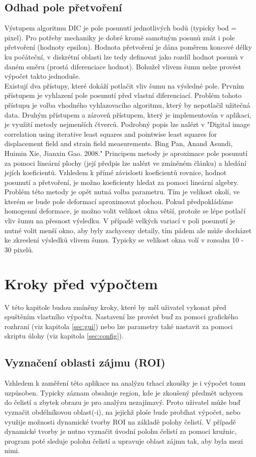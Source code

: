 \documentclass[a4paper,12pt]{article}
\begin{document}
\subsection{Odhad pole přetvoření}
Výstupem algoritmu DIC je pole posunutí jednotlivých bodů (typicky bod = pixel). Pro potřeby mechaniky je dobré kromě samotným posunů znát i pole přetvoření (hodnoty epsilon). Hodnota přetvoření je dána poměrem koncové délky ku počáteční, v diskrétní oblasti lze tedy definovat jako rozdíl hodnot posunů v daném směru (prostá diferenciace hodnot). Bohužel vlivem šumu nelze provést výpočet takto jednoduše.\\ Existují dva přístupy, které dokáží potlačit vliv šumu na výsledné pole. Prvním přístupem je vyhlazení pole posunutí před vlastní diferenciací. Problém tohoto přístupu je volba vhodného vyhlazovacího algoritmu, který by nepotlačil užitečná data. Druhým přístupem a zároveň přístupem, který je implementován v aplikaci, je využití metody nejmenších čtverců. Podrobný popis lze nalézt v "Digital image correlation using iterative least squares and pointwise least squares for displacement field and strain field measurements. Bing Pan, Anand Asundi, Huimin Xie, Jianxin Gao. 2008." Principem metody je aproximace pole posunutí za pomoci lineární plochy (její předpis lze nalézt ve zmíněném článku) a hledání jejích koeficientů. Vzhledem k přímé závislosti koeficientů rovnice, hodnot posunutí a přetvoření, je možno koeficienty hledat za pomoci lineární algebry. Problém této metody je opět nutná volba parametru. Tím je velikost okolí, ve kterém se bude pole deformací aproximovat plochou. Pokud předpokládáme homogenní deformace, je možno volit velikost okna větší, protože se lépe potlačí vliv šumu na přesnost výsledku. V případě velkých variací v poli posunutí je nutné volit menší okno, aby byly zachyceny detaily, tím pádem ale může docházet ke zkreslení výsledků vlivem šumu. Typicky se velikost okna volí v rozsahu 10 - 30 pixelů.
\newpage
\section{Kroky před výpočtem}
V této kapitole budou zmíněny kroky, které by měl uživatel vykonat před spuštěním vlastního výpočtu. Nastavení lze provést buď za pomoci grafického rozhraní (viz kapitola \ref{sec:gui}) nebo lze parametry také nastavit za pomoci skriptu úlohy (viz kapitola \ref{sec:config}).
\subsection{Vyznačení oblasti zájmu (ROI)}
Vzhledem k zaměření této aplikace na analýzu trhací zkoušky je i výpočet tomu uzpůsoben. Typicky záznam obsahuje region, kde je zkoušený předmět uchycen do čelistí a zbytek obrazu je pro analýzu nezajímavý. Proto uživatel může buď vyznačit obdélníkovou oblast(-i), na jejichž ploše bude probíhat výpočet, nebo využije možnosti dynamické tvorby ROI na základě polohy čelistí. V případě dynamické tvorby je nutno vyznačit úvodní polohu čelistí za pomoci kružnic, program poté sleduje polohu čelistí a upravuje oblast zájmu tak, aby byla mezi nimi.
\end{document}
